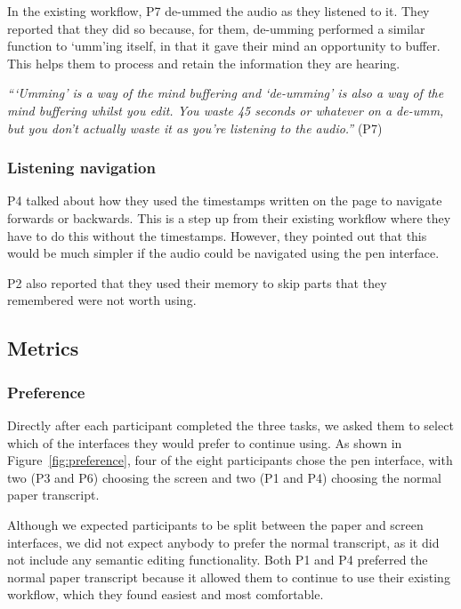
In the existing workflow, P7 de-ummed the audio as they listened to it. They reported that they did so because, for
them, de-umming performed a similar function to `umm'ing itself, in that it gave their mind an opportunity to buffer.
This helps them to process and retain the information they are hearing.

\textit{```Umming' is a way of the mind buffering and `de-umming' is also a way of the mind buffering whilst you edit.
You waste 45 seconds or whatever on a de-umm, but you don't actually waste it as you're listening to the audio.''} (P7)

\subsubsection{Listening navigation}

P4 talked about how they used the timestamps written on the page to navigate forwards or backwards. This is a step up
from their existing workflow where they have to do this without the timestamps. However, they pointed out that this
would be much simpler if the audio could be navigated using the pen interface.

P2 also reported that they used their memory to skip parts that they remembered were not worth using.

\subsection{Metrics}

\subsubsection{Preference}

Directly after each participant completed the three tasks, we asked them to select which of the interfaces they would
prefer to continue using. As shown in Figure~\ref{fig:preference}, four of the eight participants chose the pen
interface, with two (P3 and P6) choosing the screen and two (P1 and P4) choosing the normal paper transcript.

Although we expected participants to be split between the paper and screen interfaces, we did not expect anybody to
prefer the normal transcript, as it did not include any semantic editing functionality.  Both P1 and P4 preferred the
normal paper transcript because it allowed them to continue to use their existing workflow, which they found easiest
and most comfortable.

